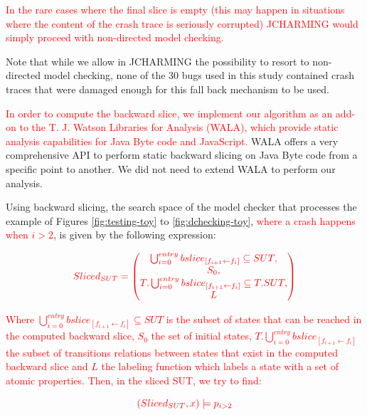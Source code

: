 \documentclass[times, doublespace]{smrauth}
\newcommand{\red}[1]{\textcolor{red}{#1}}
\begin{document}
{\red{In the rare cases where the final slice is empty (this
may happen in situations where the content of the crash trace
is seriously corrupted) JCHARMING would simply
proceed with non-directed model checking.}




Note that while we allow in JCHARMING the possibility to resort to non-directed
model
checking, none of the 30 bugs used in this study contained crash traces
that were damaged enough for this fall back mechanism to be used.

\red{In order to compute the backward slice, we implement our
algorithm as an add-on to the T. J. Watson
Libraries for Analysis (WALA)\cite{IBM2006}, which provide static
analysis capabilities for Java Byte code and JavaScript.}  WALA offers a very comprehensive API
to perform static backward slicing on Java Byte code from a
specific point to another.
We did not need to extend WALA to perform our
analysis.



Using backward slicing, the search space of the model checker
that processes the example of Figures \ref{fig:testing-toy} to \ref{fig:dchecking-toy}, \red{where a crash happens when $i>2$}, is given by the following expression:

\begin{equation}
  \red{
  Sliced_{SUT} =
  \begin{pmatrix}
    \bigcup_{i=0}^{entry} bslice_{[f_{i+1} \leftarrow f_i]} \subseteq SUT, \\
    S_0, \\
    T.\bigcup_{i=0}^{entry} bslice_{[f_{i+1} \leftarrow f_i]}  \subseteq T.SUT, \\
    L
  \end{pmatrix}
  }
\end{equation}

\red{\noindent Where $\bigcup_{i=0}^{entry} bslice_{[f_{i+1} \leftarrow f_i]} \subseteq SUT$ is the subset of states that can be reached in the computed backward slice, $S_0$ the set of initial states, $T.\bigcup_{i=0}^{entry} bslice_{[f_{i+1} \leftarrow f_i]}$ the subset of transitions relations between states that exist in the computed backward slice and $L$ the labeling function which labels a state with a set of atomic properties.
Then, in the sliced SUT, we try to find:}

\begin{equation}
  \red{
    (Sliced_{SUT}, x) \models p_{i>2}
  }
\end{equation}

}
\end{document}
